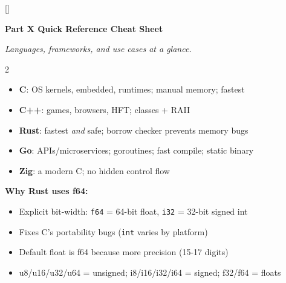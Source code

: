 \documentclass[11pt, letterpaper]{article}
\newcommand{\purplesections}{%
  \titleformat{\section}{\large\bfseries\color{sectionpurple}}{}{0em}{}[\color{sectionpurple}\titlerule]%
  \titleformat{\subsection}{\normalsize\bfseries\color{sectionpurple!80!black}}{}{0em}{}%
}
\newcommand{\partbanner}[3]{%
  \begin{tcolorbox}[colback=#1, colframe=#2, boxrule=1.2pt, arc=4pt,
    left=8pt, right=8pt, top=6pt, bottom=6pt]
    \begin{center}{\LARGE\bfseries #3}\end{center}
  \end{tcolorbox}%
}
\begin{document}
\purplesections
{}
\partbanner{part3bg}{sectionpurple}{Part X \quad Quick Reference Cheat Sheet}

\vspace{4pt}
\begin{center}\small\itshape Languages, frameworks, and use cases at a glance.\end{center}

\begin{tcolorbox}[colback=part6bg, colframe=sectionred,
  title={\bfseries Systems Languages}, arc=3pt, boxrule=1pt]
\footnotesize
\begin{multicols}{2}
\begin{itemize}[noitemsep, leftmargin=*]
  \item \textbf{C}: OS kernels, embedded, runtimes; manual memory; fastest
  \item \textbf{C++}: games, browsers, HFT; classes + RAII
  \item \textbf{Rust}: fastest \emph{and} safe; borrow checker prevents memory bugs
  \item \textbf{Go}: APIs/microservices; goroutines; fast compile; static binary
  \item \textbf{Zig}: a modern C; no hidden control flow
\end{itemize}
\columnbreak
\textbf{Why Rust uses f64:}
\begin{itemize}[noitemsep, leftmargin=*]
  \item Explicit bit-width: \texttt{f64} = 64-bit float, \texttt{i32} = 32-bit signed int
  \item Fixes C's portability bugs (\texttt{int} varies by platform)
  \item Default float is f64 because more precision (15-17 digits)
  \item u8/u16/u32/u64 = unsigned; i8/i16/i32/i64 = signed; f32/f64 = floats
\end{itemize}
\end{multicols}
\end{tcolorbox}

\vspace{4pt}
\end{document}
